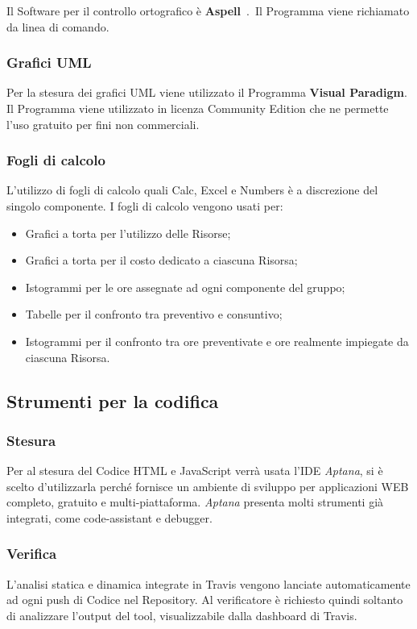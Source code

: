 Il Software per il controllo ortografico è \textbf{Aspell}\ .\ Il Programma viene richiamato da linea di comando.


\subsubsection{Grafici UML} 

Per la stesura dei grafici UML viene utilizzato il Programma \textbf{Visual Paradigm}. Il Programma viene utilizzato in licenza Community Edition che ne permette l’uso gratuito per fini non commerciali.

\subsubsection{Fogli di calcolo}
\label{sec:fogliDiCalcolo}
L'utilizzo di fogli di calcolo quali Calc, Excel e Numbers è a discrezione del singolo componente.
I fogli di calcolo vengono usati per:
\begin{itemize}
\item Grafici a torta per l'utilizzo delle Risorse;
\item Grafici a torta per il costo dedicato a ciascuna Risorsa;
\item Istogrammi per le ore assegnate ad ogni componente del gruppo;
\item Tabelle per il confronto tra preventivo e consuntivo;
\item Istogrammi per il confronto tra ore preventivate e ore realmente impiegate da ciascuna Risorsa.
\end{itemize}

\subsection{Strumenti per la codifica}
\label{sec:strumentiCodifica}
\subsubsection{Stesura}
Per al stesura del Codice HTML e JavaScript verrà usata l'IDE \emph{Aptana}, si è scelto d'utilizzarla perché fornisce un ambiente di sviluppo per applicazioni WEB completo, gratuito e multi-piattaforma.
\emph{Aptana} presenta molti strumenti già integrati, come code-assistant e debugger. 
\subsubsection{Verifica}
L’analisi statica e dinamica integrate in Travis vengono lanciate automaticamente ad ogni push di Codice nel Repository. Al verificatore è richiesto quindi soltanto di analizzare l’output del tool, visualizzabile dalla dashboard di Travis.




